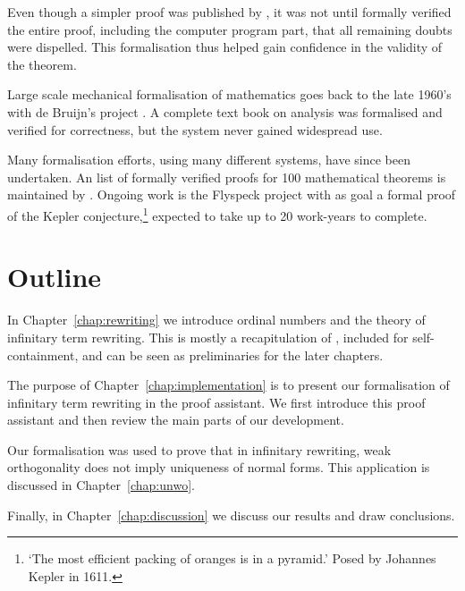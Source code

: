 Even though a simpler proof was published by \citet{robertson-97}, it
was not until \citet{gonthier-05} formally verified the entire proof,
including the computer program part, that all remaining doubts were
dispelled. This formalisation thus helped gain confidence in the
validity of the theorem.

Large scale mechanical formalisation of mathematics goes back to the
late 1960's with de Bruijn's \Automath project
\citep{nederpelt-94}. A complete text book on analysis
\citep{landau-65} was formalised and verified for correctness, but the
system never gained widespread use.

Many formalisation efforts, using many different systems, have since
been undertaken. An list of formally verified proofs for 100
mathematical theorems is maintained by \citet{wiedijk-08}. Ongoing
work is the Flyspeck project \citep{hales-09} with as goal a formal
proof of the Kepler conjecture,\footnote{`The most efficient packing
  of oranges is in a pyramid.' Posed by Johannes Kepler in 1611.}
expected to take up to 20 work-years to complete.


\section*{Outline}

In Chapter~\ref{chap:rewriting} we introduce ordinal numbers and the
theory of infinitary term rewriting. This is mostly a recapitulation
of \citet{terese-03}, included for self-containment, and can be seen
as preliminaries for the later chapters.

The purpose of Chapter~\ref{chap:implementation} is to present our
formalisation of infinitary term rewriting in the \Coq proof
assistant. We first introduce this proof assistant and then review the
main parts of our development.

Our formalisation was used to prove that in infinitary rewriting, weak
orthogonality does not imply uniqueness of normal forms. This
application is discussed in Chapter~\ref{chap:unwo}.

Finally, in Chapter~\ref{chap:discussion} we discuss our results and
draw conclusions.
